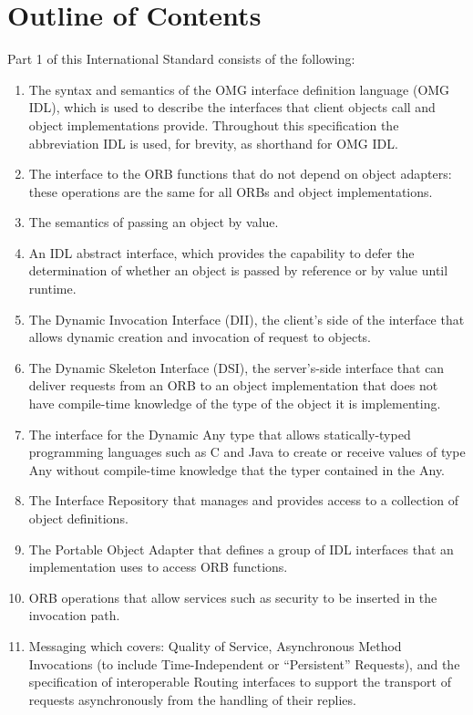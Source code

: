 \section{Outline of Contents}\label{outline-of-contents}

Part 1 of this International Standard consists of the following:

\begin{enumerate}
\def\labelenumi{\arabic{enumi}.}
\item
  The syntax and semantics of the OMG interface definition language (OMG
  IDL), which is used to describe the interfaces that client objects
  call and object implementations provide. Throughout this specification
  the abbreviation IDL is used, for brevity, as shorthand for OMG IDL.
\item
  The interface to the ORB functions that do not depend on object
  adapters: these operations are the same for all ORBs and object
  implementations.
\item
  The semantics of passing an object by value.
\item
  An IDL abstract interface, which provides the capability to defer the
  determination of whether an object is passed by reference or by value
  until runtime.
\item
  The Dynamic Invocation Interface (DII), the client's side of the
  interface that allows dynamic creation and invocation of request to
  objects.
\item
  The Dynamic Skeleton Interface (DSI), the server's-side interface that
  can deliver requests from an ORB to an object implementation that does
  not have compile-time knowledge of the type of the object it is
  implementing.
\item
  The interface for the Dynamic Any type that allows statically-typed
  programming languages such as C and Java to create or receive values
  of type Any without compile-time knowledge that the typer contained in
  the Any.
\item
  The Interface Repository that manages and provides access to a
  collection of object definitions.
\item
  The Portable Object Adapter that defines a group of IDL interfaces
  that an implementation uses to access ORB functions.
\item
  ORB operations that allow services such as security to be inserted in
  the invocation path.
\item
  Messaging which covers: Quality of Service, Asynchronous Method
  Invocations (to include Time-Independent or ``Persistent'' Requests),
  and the specification of interoperable Routing interfaces to support
  the transport of requests asynchronously from the handling of their
  replies.
\end{enumerate}

